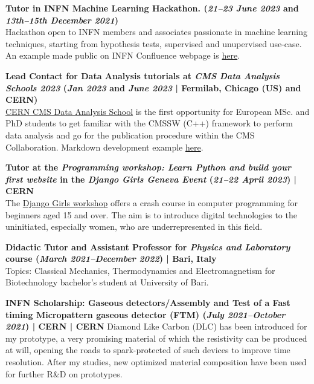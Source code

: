 \documentclass[11pt]{res}
\begin{document}
\begin{resume}
\textbf{Tutor in INFN Machine Learning Hackathon. (\textit{21--23 June 2023} and \textit{13th--15th December 2021})}\\ 
Hackathon open to INFN members and associates passionate in machine learning techniques, starting from hypothesis tests, supervised and unupervised use-case. An example made public on INFN Confluence webpage is \href{https://confluence.infn.it/pages/viewpage.action?pageId=53906361}{here}.

\textbf{Lead Contact for Data Analysis tutorials at \textit{CMS Data Analysis Schools 2023} (\textit{Jan 2023} and \textit{June 2023} | Fermilab, Chicago (US) and CERN)}\\
\href{https://indico.cern.ch/event/1257234/}{CERN CMS Data Analysis School} is the first opportunity for European MSc. and PhD students to get familiar with the CMSSW (C++) framework to perform data analysis and go for the publication procedure within the CMS Collaboration. Markdown development example \href{https://bdanzi.github.io/trackingvertexing/index.html}{here}.

\textbf{Tutor at the \textit{Programming workshop: Learn Python and build your first website} in the \textit{Django Girls Geneva Event} (\textit{21--22 April 2023}) | CERN}\\
The \href{https://djangogirls.org/en/geneva_en/}{Django Girls workshop} offers a crash course in computer programming for beginners aged 15 and over. The aim is to introduce digital technologies to the uninitiated, especially women, who are underrepresented in this field.

\textbf{Didactic Tutor and Assistant Professor for \textit{Physics and Laboratory} course (\textit{March 2021--December 2022}) | Bari, Italy}\\
Topics: Classical Mechanics, Thermodynamics and Electromagnetism for Biotechnology bachelor's student at University of Bari.

\textbf{INFN Scholarship: Gaseous detectors/Assembly and Test of a Fast timing Micropattern gaseous detector (FTM) \textbf{(\textit{July 2021--October 2021}) | CERN} | CERN} 
Diamond Like Carbon (DLC) has been introduced for my prototype, a very promising material of which the resistivity can be produced at will, opening the roads to spark-protected of such devices to improve time resolution. After my studies, new optimized material composition have been used for further R\&D on prototypes.


\end{resume}
\end{document}
